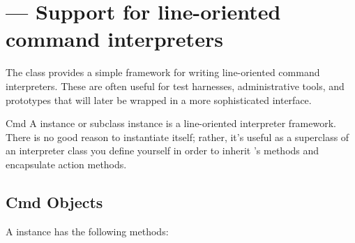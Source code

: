 \section{ ---
         Support for line-oriented command interpreters}



The  class provides a simple framework for writing
line-oriented command interpreters.  These are often useful for
test harnesses, administrative tools, and prototypes that will
later be wrapped in a more sophisticated interface.

\begin{classdesc}{Cmd}{}
A  instance or subclass instance is a line-oriented
interpreter framework.  There is no good reason to instantiate
 itself; rather, it's useful as a superclass of an
interpreter class you define yourself in order to inherit
's methods and encapsulate action methods.
\end{classdesc}

\subsection{Cmd Objects}
\label{Cmd-objects}

A  instance has the following methods:

